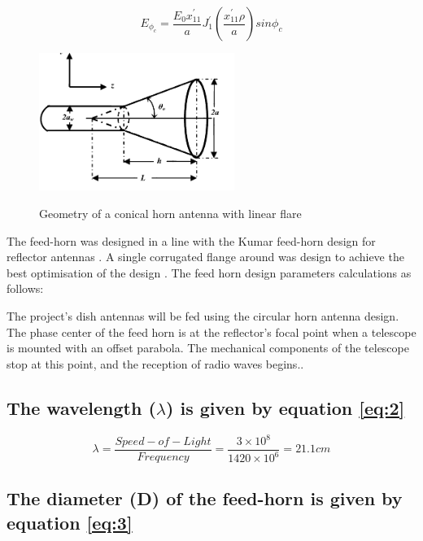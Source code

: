 {\begin{equation}
    E_{\phi}_{c} = \frac{E_0 x^{'}_{11}}{a}J^{'}_1 (\frac{x^{'}_{11} \rho}{a}) sin\phi_c
\end{equation}


\begin{figure}[htp]
 \centering
\includegraphics[width=2.5in]{Figures/Geometry-of-a-conical-horn-antenna.png}
\caption{Geometry of a conical horn antenna with linear flare }
\label{fig:4.6}
\cite{zaman2011approximate}
\end{figure}




The feed-horn was designed in a line with the Kumar feed-horn design for reflector antennas \cite{sETILeagueTechnicalManual_2022}. A single corrugated flange around was design to achieve the best optimisation of the design \cite{milligan2005modern,kumar1978reduce}.
The feed horn design parameters calculations as follows:

The project's dish antennas will be fed using the circular horn antenna design. The phase center of the feed horn is at the reflector's focal point when a telescope is mounted with an offset parabola. The mechanical components of the telescope stop at this point, and the reception of radio waves begins..

\subsection{The wavelength (\(\lambda\)) is given by equation \ref{eq:2}}

\begin{equation}
\lambda = \frac{Speed-of-Light}{Frequency} = \frac{3\times 10^8}{1420\times 10^6} = 21.1 cm
\label{eq:2}
\end{equation}


\subsection{The diameter (D)  of the feed-horn is given by equation \ref{eq:3}}

}
